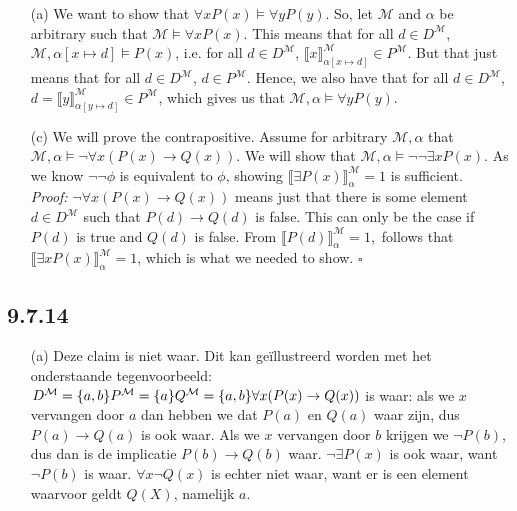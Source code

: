 \begin{enumerate}

\item[(a)] We want to show that $\forall x P(x)\vDash \forall
  yP(y)$. So, let $\mathcal{M}$ and $\alpha$ be arbitrary such that
  $\mathcal{M}\vDash\forall xP(x)$. This means that for all $d\in
  D^\mathcal{M}$, $\mathcal{M},\alpha[x\mapsto d]\vDash P(x)$,
  i.e. for all $d\in D^\mathcal{M}$, $\llbracket
  x\rrbracket^\mathcal{M}_{\alpha[x\mapsto d]}\in P^\mathcal{M}$. But
  that just means that for all $d\in D^\mathcal{M}$, $d\in
  P^\mathcal{M}$. Hence, we also have that for all $d\in
  D^\mathcal{M}$,   $d=\llbracket
  y\rrbracket^\mathcal{M}_{\alpha[y\mapsto d]}\in P^\mathcal{M}$,
  which gives us that $\mathcal{M},\alpha\vDash\forall y P(y)$.
  
\item[(c)] We will prove the contrapositive. Assume for arbitrary $\mathcal{M}, \alpha$ that $\mathcal{M}, \alpha \vDash \neg \forall x (P(x) \rightarrow Q(x))$. We will show that $\mathcal{M}, \alpha \vDash \neg \neg \exists x P(x)$. As we know $\neg \neg \phi$ is equivalent to $\phi$, showing $\llbracket\exists P(x)\rrbracket_\alpha^\mathcal{M} =1$ is sufficient.\\\textit{Proof:} $\neg \forall x (P(x) \rightarrow Q(x)) $ means just that there is some element $d \in D^\mathcal{M}$ such that $P(d) \rightarrow Q(d)$ is false. This can only be the case if $P(d)$ is true and $Q(d)$ is false. From $\llbracket P(d)\rrbracket_\alpha^\mathcal{M}=1$,\ follows that $\llbracket \exists x P(x)\rrbracket_\alpha^\mathcal{M} =1$, which is what we needed to show. $\square$

\end{enumerate}


    

\subsection*{9.7.14}
\begin{enumerate}
    \item[(a)] Deze claim is niet waar. Dit kan geïllustreerd worden met het onderstaande tegenvoorbeeld:\\
    $ D^\mathcal{M} = \{a,b\} \\
    P^\mathcal{M} = \{a\} \\
    Q^\mathcal{M} = \{a,b\}
    \\ \forall x (P(x)\rightarrow Q(x))$ is waar: als we $x$ vervangen door $a$ dan hebben we dat $P(a)$ en $Q(a)$ waar zijn, dus $P(a)\rightarrow Q(a)$ is ook waar. Als we $x$ vervangen door $b$ krijgen we $\neg P(b)$, dus dan is de implicatie $P(b)\rightarrow Q(b)$ waar. $\neg \exists P(x)$ is ook waar, want $\neg P(b)$ is waar. $\forall x \neg Q(x)$ is echter niet waar, want er is een element waarvoor geldt $Q(X)$, namelijk $a$. 
\end{enumerate}
	
